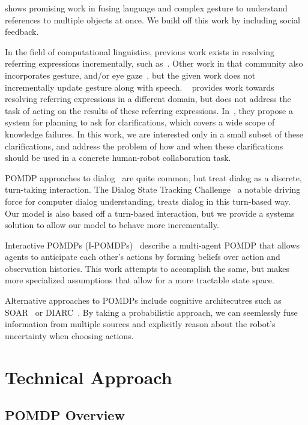 \documentclass{article}
\begin{document}
\begin{multicols}{2}
\cite{matuszek14} shows promising work in fusing language and complex gesture to understand references to multiple objects at once. We build off this work by including social feedback. 

In the field of computational linguistics, previous work exists in resolving referring expressions incrementally, such as~\cite{schlangen09,Zender2008Conceptual,Gieselmann}. Other work in that community also incorporates gesture, and/or eye gaze~\citep{kennington13,kennington15a}, but the given work does not incrementally update gesture along with speech. ~\cite{chairmi} provides work towards resolving referring expressions in a different domain, but does not address the task of acting on the results of these referring expressions. In~\cite{kruijffclarification}, they propose a system for planning to ask for clarifications, which covers a wide scope of knowledge failures. In this work, we are interested only in a small subset of these clarifications, and address the problem of how and when these clarifications should be used in a concrete human-robot collaboration task. 

POMDP approaches to dialog~\citep{young13} are quite common, but treat dialog
as a discrete, turn-taking interaction. The Dialog State Tracking
Challenge~\citep{williams2013dialog} a notable driving force for computer
dialog understanding, treats dialog in this turn-based way. Our model is also based off a turn-based interaction, but we provide a systems solution to allow our model to behave more incrementally.  

Interactive POMDPs (I-POMDPs)~\citep{gmytrasiewicz2005framework} describe a multi-agent POMDP that allows agents to anticipate each other's actions by forming beliefs over action and observation histories. This work attempts to accomplish the same, but makes more specialized assumptions that allow for a more tractable state space. 

Alternative approaches to
POMDPs include cognitive architecutres such as SOAR~\citep{soar} or
DIARC~\citep{diarc}.  By taking a probabilistic approach, we can seemlessly
fuse information from multiple sources and explicitly reason about the
robot's uncertainty when choosing actions.
\section{Technical Approach}

\subsection{POMDP Overview}


\end{multicols}
\end{document}
